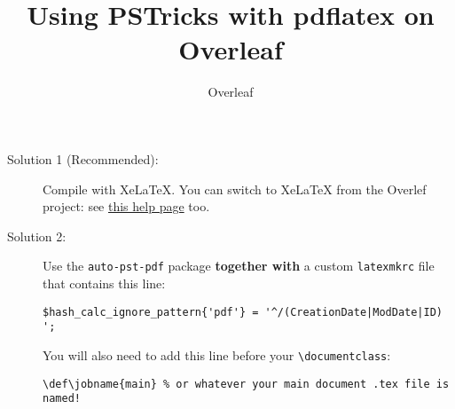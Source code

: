 \documentclass[a4paper]{article}
\title{Using PSTricks with pdflatex on Overleaf}
\author{Overleaf}
\begin{document}
\maketitle

\begin{description}
\item[Solution 1 (Recommended):] Compile with XeLaTeX. You can switch to XeLaTeX from the Overlef project: see \href{https://www.overleaf.com/learn/how-to/Changing_compiler}{this help page} too.

\item[Solution 2:] Use the \texttt{auto-pst-pdf} package \textbf{together with} a custom \texttt{latexmkrc} file that contains this line:

\begin{verbatim}
$hash_calc_ignore_pattern{'pdf'} = '^/(CreationDate|ModDate|ID) ';
\end{verbatim}

You will also need to add this line before your \verb|\documentclass|:

\begin{verbatim}
\def\jobname{main} % or whatever your main document .tex file is named!
\end{verbatim}

\end{description}
\end{document}
